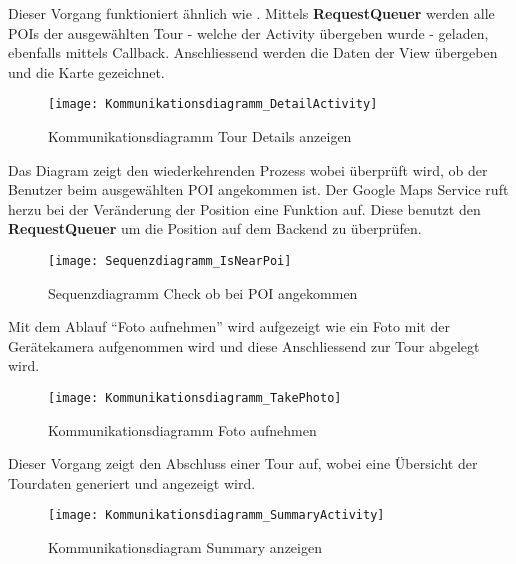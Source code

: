 Dieser Vorgang funktioniert ähnlich wie . Mittels
\textbf{RequestQueuer} werden alle POIs der ausgewählten Tour - welche der Activity übergeben
wurde - geladen, ebenfalls mittels Callback. Anschliessend werden die Daten der View
übergeben und die Karte gezeichnet.

\begin{figure}
  \texttt{[image: Kommunikationsdiagramm\_DetailActivity]}
  \caption{Kommunikationsdiagramm Tour Details anzeigen}
\end{figure}

\newpage
{}
Das Diagram zeigt den wiederkehrenden Prozess wobei überprüft wird, ob der Benutzer beim
ausgewählten POI angekommen ist. Der Google Maps Service ruft herzu bei der Veränderung
der Position eine Funktion auf. Diese benutzt den \textbf{RequestQueuer} um die Position
auf dem Backend zu überprüfen.

\begin{figure}
  \texttt{[image: Sequenzdiagramm\_IsNearPoi]}
  \caption{Sequenzdiagramm Check ob bei POI angekommen}
\end{figure}

\newpage
{}
Mit dem Ablauf ``Foto aufnehmen'' wird aufgezeigt wie ein Foto mit der Gerätekamera
aufgenommen wird und diese Anschliessend zur Tour abgelegt wird.

\begin{figure}
  \texttt{[image: Kommunikationsdiagramm\_TakePhoto]}
  \caption{Kommunikationsdiagramm Foto aufnehmen}
\end{figure}

Dieser Vorgang zeigt den Abschluss einer Tour auf, wobei eine Übersicht der Tourdaten
generiert und angezeigt wird.
\begin{figure}
  \texttt{[image: Kommunikationsdiagramm\_SummaryActivity]}
  \caption{Kommunikationsdiagram Summary anzeigen}
\end{figure}
